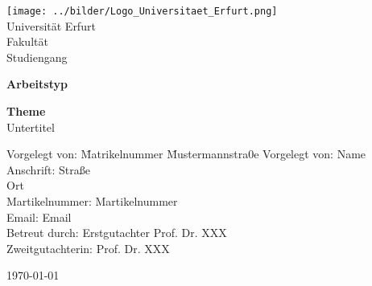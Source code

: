 \documentclass[
	a4paper,%
	oneside,%
	12pt,%
	halfparskip,%
	headinclude,%
	headsepline,%
	plainheadsepline,
	footsepline, %
	plainfootsepline,
	bibtotoc,%
	liststotoc,%
	toc=bibliography,
	]{scrbook}
\date{\today}
\begin{document}


\begin{titlepage}
 \thispagestyle{empty}
  \texttt{[image: ../bilder/Logo\_Universitaet\_Erfurt.png]}\\
	Universität Erfurt \\
	Fakultät \\
	Studiengang

	\vfill{}

	\begin{center}
			\Huge\textbf{Arbeitstyp}
	\end{center}

	\begin{center}
			\Huge\textbf{Theme} \\
			\Large Untertitel
	\end{center}

	\vfill{}

\begin{tabbing}
	Vorgelegt von:\hspace{0.5em} \= Matrikelnummer\hspace{0.7em} \=  Mustermannstra0e \kill
	Vorgelegt von: \+\> Name\\
		Anschrift: \+\> Straße \\
		\-Ort \\
	Martikelnummer: \> Martikelnummer \\
	\-Email: \> Email \\[2ex]
	Betreut durch: \+\> Erstgutachter \> Prof. Dr. XXX \\
						Zweitgutachterin: \> Prof. Dr. XXX \\
\end{tabbing}

\vspace{5ex}

\today{}

\end{titlepage}
\end{document}
